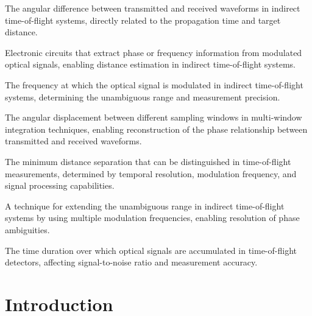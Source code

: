 \documentclass[12pt,a4paper,oneside]{report}
\newif\ifarabicpagenum
\let\oldchapter\chapter
\renewcommand{\chapter}{\thispagestyle{fancy}\oldchapter}
\begin{document}
{\begin{description}[leftmargin=3cm, style=nextline, itemsep=0pt, parsep=0pt, topsep=0pt, partopsep=0pt]
    \item[Phase difference] The angular difference between transmitted and received waveforms in indirect time-of-flight systems, directly related to the propagation time and target distance.
    
    \item[Demodulation circuitry] Electronic circuits that extract phase or frequency information from modulated optical signals, enabling distance estimation in indirect time-of-flight systems.
    
    \item[Modulation frequency] The frequency at which the optical signal is modulated in indirect time-of-flight systems, determining the unambiguous range and measurement precision.
    
    \item[Phase offset] The angular displacement between different sampling windows in multi-window integration techniques, enabling reconstruction of the phase relationship between transmitted and received waveforms.
    
    \item[Range resolution] The minimum distance separation that can be distinguished in time-of-flight measurements, determined by temporal resolution, modulation frequency, and signal processing capabilities.
    
    \item[Multi-frequency modulation] A technique for extending the unambiguous range in indirect time-of-flight systems by using multiple modulation frequencies, enabling resolution of phase ambiguities.
    
    \item[Signal integration period] The time duration over which optical signals are accumulated in time-of-flight detectors, affecting signal-to-noise ratio and measurement accuracy.
\end{description}
}
\vspace*{\fill}
\newpage

\setcounter{page}{1}
\arabicpagenumtrue  %

\chapter{Introduction}
\label{chap:introduction}
\newpage
\end{document}

